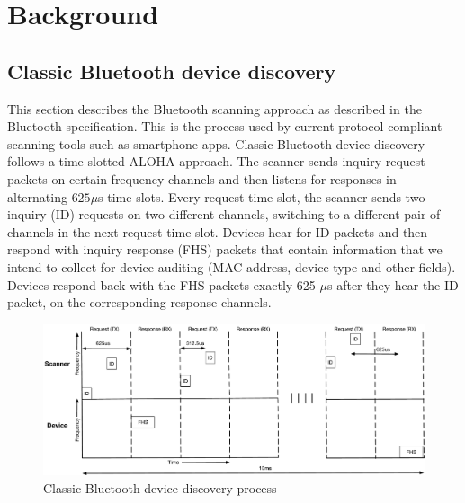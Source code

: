 \section{Background}
\label{sec:hyperscanner:bkgd}
\subsection{Classic Bluetooth device discovery}
This section describes the Bluetooth scanning approach as described in the Bluetooth specification.
%
This is the process used by current protocol-compliant scanning tools such as smartphone apps.
%
Classic Bluetooth device discovery follows a time-slotted ALOHA approach.
%
The scanner sends inquiry request packets on certain frequency channels and then listens for responses in alternating $625\mu$s time slots.
%
Every request time slot, the scanner sends two inquiry (ID) requests on two different channels, switching to a different pair of channels in the next request time slot.
%
Devices hear for ID packets and then respond with inquiry response (FHS) packets that contain information that we intend to collect for device auditing (MAC address, device type and other fields).
%
Devices respond back with the FHS packets exactly 625 $\mu$s after they hear the ID packet, on the corresponding response channels.
%
\begin{figure}
    \centering
    \captionsetup{justification=centering}
    \includegraphics[width=\linewidth]{hyperscanner/figs/bt_single_chan.pdf}
    \caption{Classic Bluetooth device discovery process}
    \label{fig:hyperscanner:bt_single_chan}
\end{figure}

